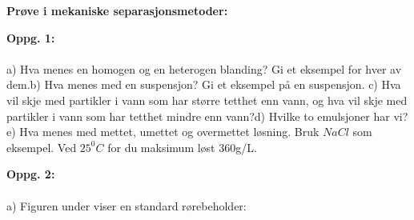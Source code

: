 \documentclass{minmal}
\begin{document}
\begin{center}
    \textbf{Prøve i mekaniske separasjonsmetoder:}
\end{center}
\noindent
\textbf{Oppg. 1:}\\\\
\noindent
a) Hva menes en homogen og en heterogen blanding? Gi et eksempel for hver av dem.\nl[1]
b) Hva menes med en suspensjon? Gi et eksempel på en suspensjon. \nl[1]
c) Hva vil skje med partikler i vann som har større tetthet enn vann, og hva vil skje med partikler i vann som har tetthet mindre enn vann?\nl[1]
d) Hvilke to emulsjoner har vi? 
e) Hva menes med mettet, umettet og overmettet løsning. Bruk $NaCl$ som eksempel.  Ved $25^0C$ for du maksimum løst 360g/L.  \nl[2]

\noindent \textbf{Oppg. 2:}\\\\
a) Figuren under viser en standard rørebeholder:\\
\end{document}
